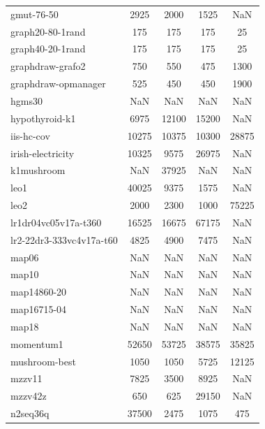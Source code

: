 \begin{longtable}{lcccc}
gmut-76-50                  &     2925 &     2000 &     1525 &   NaN \\
graph20-80-1rand            &      175 &      175 &      175 &    25 \\
graph40-20-1rand            &      175 &      175 &      175 &    25 \\
graphdraw-grafo2            &      750 &      550 &      475 &  1300 \\
graphdraw-opmanager         &      525 &      450 &      450 &  1900 \\
hgms30                      &      NaN &      NaN &      NaN &   NaN \\
hypothyroid-k1              &     6975 &    12100 &    15200 &   NaN \\
iis-hc-cov                  &    10275 &    10375 &    10300 & 28875 \\
irish-electricity           &    10325 &     9575 &    26975 &   NaN \\
k1mushroom                  &      NaN &    37925 &      NaN &   NaN \\
leo1                        &    40025 &     9375 &     1575 &   NaN \\
leo2                        &     2000 &     2300 &     1000 & 75225 \\
lr1dr04vc05v17a-t360        &    16525 &    16675 &    67175 &   NaN \\
lr2-22dr3-333vc4v17a-t60    &     4825 &     4900 &     7475 &   NaN \\
map06                       &      NaN &      NaN &      NaN &   NaN \\
map10                       &      NaN &      NaN &      NaN &   NaN \\
map14860-20                 &      NaN &      NaN &      NaN &   NaN \\
map16715-04                 &      NaN &      NaN &      NaN &   NaN \\
map18                       &      NaN &      NaN &      NaN &   NaN \\
momentum1                   &    52650 &    53725 &    38575 & 35825 \\
mushroom-best               &     1050 &     1050 &     5725 & 12125 \\
mzzv11                      &     7825 &     3500 &     8925 &   NaN \\
mzzv42z                     &      650 &      625 &    29150 &   NaN \\
n2seq36q                    &    37500 &     2475 &     1075 &   475 \\

\end{longtable}
